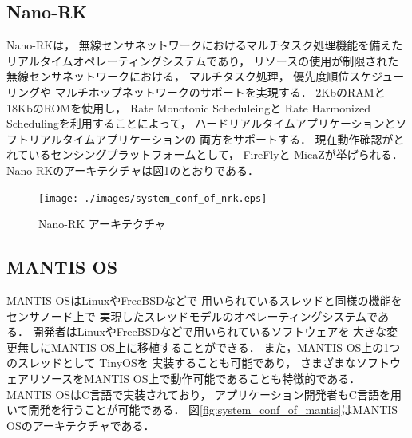 \subsection{Nano-RK}
Nano-RK\cite{Eswaran:2005:NER:1106608.1106672}は，
無線センサネットワークにおけるマルチタスク処理機能を備えた
リアルタイムオペレーティングシステムであり，
リソースの使用が制限された無線センサネットワークにおける，
マルチタスク処理，
優先度順位スケジューリングや
マルチホップネットワークのサポートを実現する．
2KbのRAMと18KbのROMを使用し，
Rate Monotonic Scheduleingと
Rate Harmonized Scheduling\cite{Rowe:2008:RSS:1475690.1475895}を利用することによって，
ハードリアルタイムアプリケーションとソフトリアルタイムアプリケーションの
両方をサポートする．
現在動作確認がとれているセンシングプラットフォームとして，
FireFly\cite{Rowe_firefly:a}と
MicaZ\cite{Hill:2002:MWP:623308.624560}が挙げられる．
Nano-RKのアーキテクチャは図\ref{fig:system_conf_of_nrk}のとおりである．

\begin{figure}[htbp]
 \begin{center}
  \texttt{[image: ./images/system\_conf\_of\_nrk.eps]}
 \end{center}
 \caption{Nano-RK アーキテクチャ}
 \label{fig:system_conf_of_nrk}
\end{figure}



\subsection{MANTIS OS}
MANTIS OS\cite{Bhatti:2005:MOE:1160162.1160178}はLinuxやFreeBSDなどで
用いられているスレッドと同様の機能をセンサノード上で
実現したスレッドモデルのオペレーティングシステムである．
開発者はLinuxやFreeBSDなどで用いられているソフトウェアを
大きな変更無しにMANTIS OS上に移植することができる．
また，MANTIS OS上の1つのスレッドとして
TinyOS\cite{Hill:2000:SAD:356989.356998}\cite{Levis04tinyos:an}を
実装することも可能であり\cite{Trumpler06asystematic}，
さまざまなソフトウェアリソースをMANTIS OS上で動作可能であることも特徴的である．
MANTIS OSはC言語で実装されており，
アプリケーション開発者もC言語を用いて開発を行うことが可能である．
図\ref{fig:system_conf_of_mantis}はMANTIS OSのアーキテクチャである．

